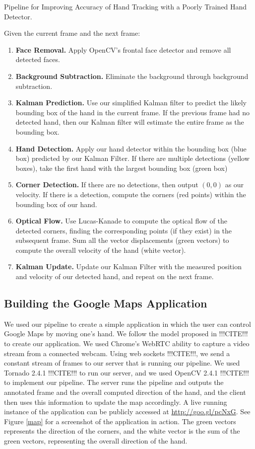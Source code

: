 \documentclass[12pt]{article}
\begin{document}
\begin{algorithm}
\caption{Pipeline for Improving Accuracy of Hand Tracking with a Poorly Trained Hand Detector.}
\label{pipeline}

\noindent Given the current frame and the next frame:
\begin{enumerate}
\item {\bf Face Removal.} Apply OpenCV's frontal face detector and remove all detected faces.
\item {\bf Background Subtraction.} Eliminate the background through background subtraction.
\item {\bf Kalman Prediction.} Use our simplified Kalman filter to predict the likely bounding box of the hand in the current frame. If the previous frame had no detected hand, then our Kalman filter will estimate the entire frame as the bounding box.
\item {\bf Hand Detection.} Apply our hand detector within the bounding box (blue box) predicted by our Kalman Filter. If there are multiple detections (yellow boxes), take the first hand with the largest bounding box (green box)
\item {\bf Corner Detection.} If there are no detections, then output $(0,0)$ as our velocity. If there is a detection, compute the corners (red points) within the bounding box of our hand.
\item {\bf Optical Flow.} Use Lucas-Kanade to compute the optical flow of the detected corners, finding the corresponding points (if they exist) in the subsequent frame. Sum all the vector displacements (green vectors) to compute the overall velocity of the hand (white vector).
\item {\bf Kalman Update.} Update our Kalman Filter with the measured position and velocity of our detected hand, and repeat on the next frame.
\end{enumerate}
\end{algorithm}

\subsection{Building the Google Maps Application}

We used our pipeline to create a simple application in which the user can control Google Maps by moving one's hand. We follow the model proposed in !!!CITE!!! to create our application. We used Chrome's WebRTC ability to capture a video stream from a connected webcam. Using web sockets !!!CITE!!!, we send a constant stream of frames to our server that is running our pipeline. We used Tornado 2.4.1 !!!CITE!!! to run our server, and we used OpenCV 2.4.1 !!!CITE!!! to implement our pipeline. The server runs the pipeline and outputs the annotated frame and the overall computed direction of the hand, and the client then uses this information to update the map accordingly. A live running instance of the application can be publicly accessed at \url{http://goo.gl/pcNxG}. See Figure \ref{map} for a screenshot of the application in action. The green vectors represents the direction of the corners, and the white vector is the sum of the green vectors, representing the overall direction of the hand.
\end{document}
